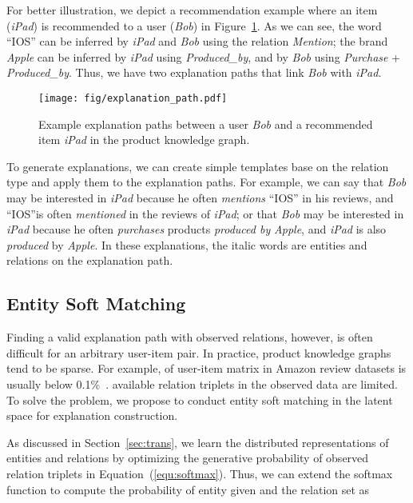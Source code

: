 \documentclass[algorithms,article,accept,moreauthors,pdftex,10pt,a4paper]{Definitions/mdpi}
\begin{document}
For better illustration, we depict a recommendation example where an item (\textit{iPad}) is recommended to a user (\textit{Bob}) in Figure~\ref{fig:example_path}.
As we can see, the word ``IOS'' can be inferred by \textit{iPad} and \textit{Bob} using the relation \textit{Mention}; the brand \textit{Apple} can be inferred by \textit{iPad} using \textit{Produced\_by}, and by \textit{Bob} using \textit{Purchase} + \textit{Produced\_by}.
Thus, we have two explanation paths that link \textit{Bob} with \textit{iPad}.
\begin{figure}[H]
	\centering
	\texttt{[image: fig/explanation\_path.pdf]}
	\caption{Example explanation paths between a user \textit{Bob} and a recommended item \textit{iPad} in the product knowledge graph.}		\vspace{-10pt}
	\label{fig:example_path}
\end{figure}



To generate explanations, we can create simple templates base on the relation type and apply them to the explanation paths.
For example, we can say that \textit{Bob} may be interested in \textit{iPad} because he often \textit{mentions} ``IOS'' in his reviews, and ``IOS''is often \textit{mentioned} in the reviews of \textit{iPad}; or that \textit{Bob} may be interested in \textit{iPad} because he often \textit{purchases} products \textit{produced by} \textit{Apple}, and \textit{iPad} is also \textit{produced} by \textit{Apple}. In these explanations, the italic words are entities and relations on the explanation path.

\subsection{Entity Soft Matching}

Finding a valid explanation path with observed relations, however, is often difficult for an arbitrary user-item pair.
In practice, product knowledge graphs tend to be sparse.
For example,  of user-item matrix in Amazon review datasets is usually below 0.1\%~\cite{mcauley2015image}.
 available relation triplets in the observed data are limited.
To solve the problem, we propose to conduct entity soft matching in the latent space for explanation construction.

As discussed in Section~\ref{sec:trans}, we learn the distributed representations of entities and relations by optimizing the generative probability of observed relation triplets in Equation~(\ref{equ:softmax}). 
Thus, we can extend the softmax function to compute the probability of entity  given  and the relation set  as
 
\end{document}
